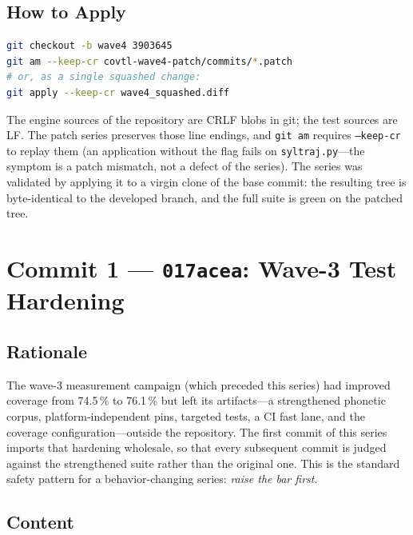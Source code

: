 \documentclass[11pt,a4paper]{article}
\newcommand{\code}[1]{\texttt{#1}}
\newcommand{\commit}[1]{\texttt{#1}}
\newcommand{\pct}[1]{{#1}\,\%}
\begin{document}
\subsection{How to Apply}

\begin{lstlisting}[language=bash, caption={Applying the series (line endings matter).}]
git checkout -b wave4 3903645
git am --keep-cr covtl-wave4-patch/commits/*.patch
# or, as a single squashed change:
git apply --keep-cr wave4_squashed.diff
\end{lstlisting}

The engine sources of the repository are CRLF blobs in git; the test
sources are LF. The patch series preserves those line endings, and
\code{git am} requires \code{--keep-cr} to replay them (an application
without the flag fails on \code{syltraj.py}---the symptom is a patch
mismatch, not a defect of the series). The series was validated by
applying it to a virgin clone of the base commit: the resulting tree
is byte-identical to the developed branch, and the full suite is
green on the patched tree.

\section{Commit 1 --- \commit{017acea}: Wave-3 Test Hardening}
\label{sec:c1}

\subsection{Rationale}

The wave-3 measurement campaign (which preceded this series) had
improved coverage from \pct{74.5} to \pct{76.1} but left its
artifacts---a strengthened phonetic corpus, platform-independent
pins, targeted tests, a CI fast lane, and the coverage
configuration---outside the repository. The first commit of this
series imports that hardening wholesale, so that every subsequent
commit is judged against the strengthened suite rather than the
original one. This is the standard safety pattern for a
behavior-changing series: \emph{raise the bar first}.

\subsection{Content}
\end{document}
